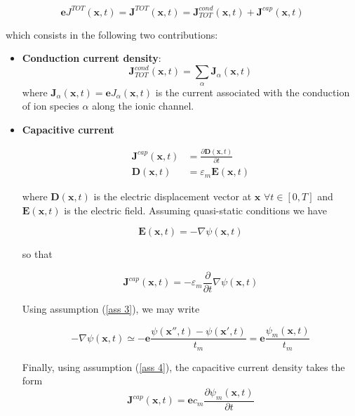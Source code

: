 \documentclass[12pt, a4paper]{article}
\begin{document}
\begin{equation}
\textbf{e} J^{TOT}(\textbf{x},t) =	\textbf{J}^{TOT}(\textbf{x},t) = \textbf{J}^{cond}_{TOT}(\textbf{x},t) +\textbf{J}^{cap}(\textbf{x},t) 
\end{equation}	

which consists in the following two contributions:

\begin{itemize}
	
	\item \textbf{Conduction current density}: 
	\begin{equation}
	\textbf{J}^{cond}_{TOT}(\textbf{x},t) = \sum_{\alpha} \textbf{J}_{\alpha}(\textbf{x},t)
	\end{equation}
	where $\textbf{J}_{\alpha}(\textbf{x},t) = \textbf{e} J_{\alpha}(\textbf{x},t)$ is the current associated with the conduction of ion species $\alpha$ along the ionic channel.
	
	\item \textbf{Capacitive current} 
	
	\begin{align}
	\textbf{J}^{cap}(\textbf{x},t) &= \frac{\partial \textbf{D}(\textbf{x},t)}{\partial t}\\	
	\textbf{D}(\textbf{x},t) &= \varepsilon_m \textbf{E}(\textbf{x},t)
	\end{align}
	
	
	
	
	where $\textbf{D}(\textbf{x},t)$ is the electric displacement vector at $\textbf{x}$ $\forall t \in [0,T]$ and $\textbf{E}(\textbf{x},t)$ is the electric field. Assuming quasi-static conditions we have
	
	\begin{equation}
	\textbf{E}(\textbf{x},t) = - \nabla \psi(\textbf{x},t)
	\end{equation}
	
	so that
	
	\begin{equation}
	\textbf{J}^{cap}(\textbf{x},t) = -\varepsilon_m \frac{\partial}{\partial t}\nabla \psi(\textbf{x},t)
	\end{equation}
	
	
	
	Using assumption (\ref{ass 3}), we may write 
	
	$$ - \nabla \psi(\textbf{x},t) \simeq - \textbf{e} \frac{\psi(\textbf{x}'',t) - \psi(\textbf{x}',t)}{t_m} = \textbf{e} \frac{\psi_m(\textbf{x},t) }{t_m} $$
	
	Finally, using assumption (\ref{ass 4}), the capacitive current density takes the form
	\begin{equation}
	\textbf{J}^{cap}(\textbf{x},t) = \textbf{e} c_m \frac{\partial \psi_m (\textbf{x},t)}{\partial t}
	\end{equation}
\end{itemize}	
\end{document}
